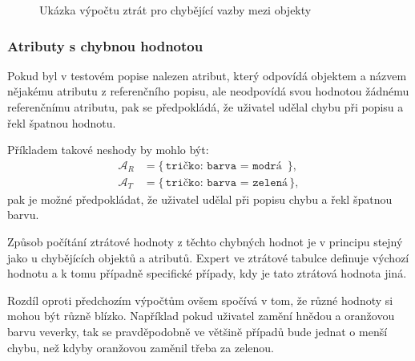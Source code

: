 \begin{figure}[H]
	\caption{Ukázka výpočtu ztrát pro chybějící vazby mezi objekty}\label{fig:example_missing_triplets}
\end{figure}

\subsubsection{Atributy s chybnou hodnotou}
Pokud byl v testovém popise nalezen atribut, který odpovídá objektem a názvem nějakému atributu z referenčního popisu,
ale neodpovídá svou hodnotou žádnému referenčnímu atributu, pak se předpokládá, že uživatel udělal chybu při popisu a řekl špatnou hodnotu.

Příkladem takové neshody by mohlo být:
\begin{align*}
	\mathcal{A}_{R} & = \bigl\{ \, \texttt{tričko: barva = modrá } \, \bigr\}, \\
	\mathcal{A}_{T} & = \bigl\{ \, \texttt{tričko: barva = zelená} \, \bigr\},
\end{align*}
pak je možné předpokládat, že uživatel udělal při popisu chybu a řekl špatnou barvu.

Způsob počítání ztrátové hodnoty z těchto chybných hodnot je v principu stejný jako u chybějících objektů a atributů.
Expert ve ztrátové tabulce definuje výchozí hodnotu a k tomu případně specifické případy, kdy je tato ztrátová hodnota jiná.

Rozdíl oproti předchozím výpočtům ovšem spočívá v tom, že různé hodnoty si mohou být různě blízko.
Například pokud uživatel zamění hnědou a oranžovou barvu veverky, tak se pravděpodobně ve většině případů bude jednat o menší chybu,
než kdyby oranžovou zaměnil třeba za zelenou.

